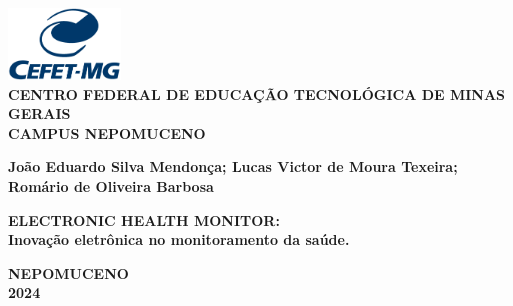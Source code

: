 \thispagestyle{empty}
\begin{titlepage}

\begin{center}
\includegraphics[width=3cm]{graphics/600px-Logo_CEFET-MG_corte.png}\\
\vspace{0.5cm}
{\normalsize \textbf{CENTRO FEDERAL DE EDUCAÇÃO TECNOLÓGICA DE MINAS GERAIS \\
CAMPUS NEPOMUCENO}}

\vspace{0.8cm}
{\large \textbf{João Eduardo Silva Mendonça; Lucas Victor de Moura Texeira; Romário de Oliveira Barbosa}}

\vspace{6cm}

{\large \textbf{ELECTRONIC HEALTH MONITOR: \\ \vspace{0.5 cm} Inovação eletrônica no monitoramento da saúde.}} \\
\vspace{0.5 cm}

\vspace{4 cm}


\vspace{3cm}
{\large \textbf{NEPOMUCENO}} \\
{\large \textbf{2024}}
\end{center}
\end{titlepage}

\newpage
\thispagestyle{empty}

\newpage\ \newpage